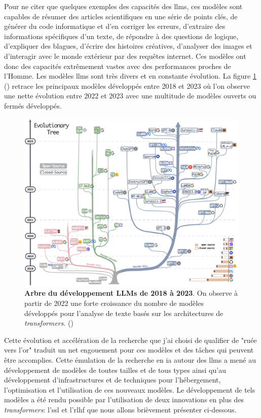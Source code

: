 Pour ne citer que quelques exemples des capacités des \gls{llms}, ces modèles sont capables de résumer des articles scientifiques en une série de points clés, de générer du code informatique et d'en corriger les erreurs, d'extraire des informations spécifiques d'un texte, de répondre à des questions de logique, d'expliquer des blagues, d'écrire des histoires créatives, d'analyser des images et d'interagir avec le monde extérieur par des requêtes internet. Ces modèles ont donc des capacités extrêmement vastes avec des performances proches de l'Homme. Les modèles \gls{llms} sont très divers et en constante évolution. La figure \ref{fig:llm-tree} (\cite{yang_harnessing_2023}) retrace les principaux modèles développés entre 2018 et 2023 où l'on observe une nette évolution entre 2022 et 2023 avec une multitude de modèles ouverts ou fermés développés. 
\begin{figure}[!htbp]
 \centering
 \includegraphics[width=1\textwidth]{figures/llm_tree.png}
 \caption[Arbre du développement LLMs de 2018 à 2023 (\cite{yang_harnessing_2023})]{\textbf{Arbre du développement LLMs de 2018 à 2023}. On observe à partir de 2022 une forte croissance du nombre de modèles développés pour l'analyse de texte basés sur les architectures de \textit{transformers}. (\cite{yang_harnessing_2023})}
 \label{fig:llm-tree}
\end{figure}
Cette évolution et accélération de la recherche que j'ai choisi de qualifier de "ruée vers l'or" traduit un net engouement pour ces modèles et des tâches qui peuvent être accomplies. Cette émulation de la recherche en \gls{ia} autour des \gls{llms} a mené au développement de modèles de toutes tailles et de tous types ainsi qu'au développement d'infrastructures et de techniques pour l'hébergement, l'optimisation et l'utilisation de ces nouveaux modèles. Le développement de tels modèles a été rendu possible par l'utilisation de deux innovations en plus des \textit{transformers}: l'\gls{ssl} et l'\gls{rlhf} que nous allons brièvement présenter ci-dessous.



